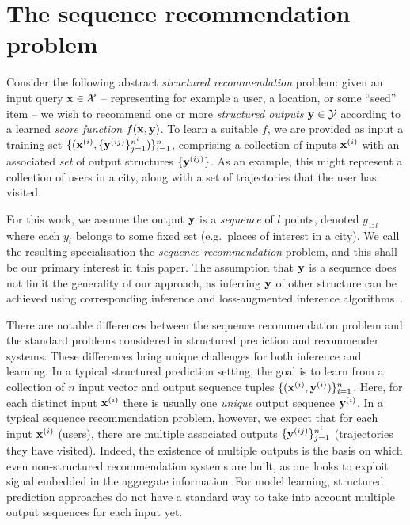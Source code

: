 \section{The sequence recommendation problem}
\label{sec:recseq}

Consider the following abstract
\emph{structured recommendation} problem:
given an input query $\mathbf{x} \in \mathcal{X}$ -- representing for example a user, a location, or some ``seed'' item --
we wish to recommend one or more \emph{structured outputs} $\mathbf{y} \in \mathcal{Y}$ according to a learned \emph{score function} $f(\mathbf{x},\mathbf{y})$. 
To learn a suitable $f$,
we are provided as input a training set
$\{ ( \mathbf{x}^{({i})}, \{ \mathbf{y}^{({ij})} \}_{j=1}^{n^i} ) \}_{i=1}^{n}$,
comprising a collection of inputs $\mathbf{x}^{({i})}$ with an associated \emph{set} of output structures $\{ \mathbf{y}^{({ij})} \}$.
As an example, this might represent a collection of users in a city, along with a set of trajectories that the user has visited.

For this work, we assume the output $\mathbf{y}$ is a \emph{sequence} of $l$ points, denoted $y_{1:l}$
where each $y_i$ belongs to some fixed set (e.g.\ places of interest in a city).
We call the resulting specialisation the \emph{sequence recommendation} problem,
and this shall be our primary interest in this paper.
The assumption that $\mathbf{y}$ is a sequence does not limit the generality of our approach, 
as inferring $\mathbf{y}$ of other structure can be achieved using corresponding inference and loss-augmented inference algorithms~\cite{joachims2009predicting}.  %

There are notable differences between the sequence recommendation problem and %
the standard problems considered in structured prediction and recommender systems. 
These differences bring unique challenges for both inference and learning. 
In a typical structured prediction setting, the goal is to learn from a collection of $n$
input vector and output sequence tuples %
$\{ (\mathbf{x}^{({i})}, \mathbf{y}^{({i})}) \}_{i = 1}^n$. Here, 
for each distinct input $\mathbf{x}^{({i})}$ there is usually one \emph{unique} output sequence $\mathbf{y}^{({i})}$. 
In a typical sequence recommendation problem, however, we expect that %
for each input $\mathbf{x}^{({i})}$ (\eg users),
there %
are multiple associated outputs %
$\{ \mathbf{y}^{({ij})} \}_{j=1}^{n^i}$ (\eg trajectories they have visited).
Indeed, the existence of multiple outputs is the basis on which even non-structured recommendation systems are built, as one looks to exploit signal embedded in the aggregate information.
For model learning, structured prediction approaches do not have a standard way to take into account multiple output sequences %
for each input %
yet. 

